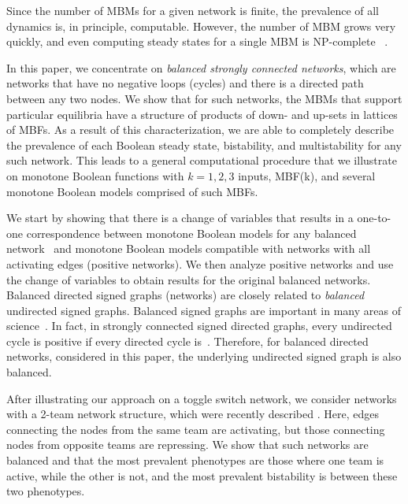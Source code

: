 \documentclass[10pt,letterpaper]{article}
\begin{document}
Since the number of MBMs for a given network is finite, the prevalence of all dynamics is, in principle, computable. However, the number of MBM grows very quickly, and even computing steady states for a single MBM is NP-complete ~\cite{dubrova_finding_2012, tamura_detecting_2009}.

In this paper, we concentrate on \textit{balanced strongly connected networks}, which are networks that have no negative loops (cycles) and there is a directed path between any two nodes. We show that for such networks, the MBMs that support particular equilibria have a structure of products of down- and up-sets in lattices of MBFs. As a result of this characterization, we are able to completely describe the prevalence of each Boolean steady state, bistability, and multistability for any such network. This leads to a general computational procedure that we illustrate on monotone Boolean functions with $k=1,2,3$ inputs, MBF(k), and several monotone Boolean models comprised of such MBFs. 

We start by showing that there is a change of variables that results in a one-to-one correspondence between monotone Boolean models for any balanced network~\cite{beineke_consistency_1978,harary_graphical_2014} and monotone Boolean models compatible with networks with all activating edges (positive networks). We then analyze positive networks and use the change of variables to obtain results for the original balanced networks.
 Balanced directed signed graphs (networks) are closely related to \textit{balanced} undirected signed graphs. Balanced signed graphs are important in many areas of science~\cite{harary_notion_1953, shi_dynamics_2019,diaz-diaz_signed_2025}. In fact, in 
strongly connected signed directed graphs, every undirected cycle is positive if every directed cycle is~\cite{harary1965structural}. Therefore, for balanced directed networks, considered in this paper, the underlying undirected signed graph is also balanced.


After illustrating our approach on a toggle switch network, we consider networks with a 2-team network structure, which were recently described \cite{hari_landscape_2022,hari_low_2025}. Here, edges connecting the nodes from the same team are activating, but those connecting nodes from opposite teams are repressing. We show that such networks are balanced and that the most prevalent phenotypes are those where one team is active, while the other is not, and the most prevalent bistability is between these two phenotypes.
\end{document}
